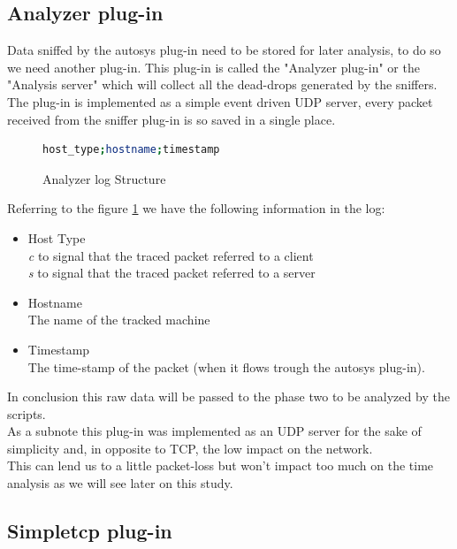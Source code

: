 \subsection{Analyzer plug-in}
Data sniffed by the autosys plug-in need to be stored for later analysis, 
to do so we need another plug-in.
This plug-in is called the "Analyzer plug-in" or the "Analysis server"
which will collect all the dead-drops generated by the sniffers.
The plug-in is implemented as a simple event driven UDP server, every
packet received from the sniffer plug-in is so saved in a single place.
\begin{figure}[H]
\begin{lstlisting}[language=bash,frame=single]
host_type;hostname;timestamp
\end{lstlisting}
\caption{Analyzer log Structure}
\label{fig:analyzer_pack_struct}
\end{figure}
Referring to the figure \ref{fig:analyzer_pack_struct} we have the following
information in the log:
\begin{itemize}
\item Host Type \hfill \\
\emph{c} to signal that the traced packet referred to a client\\
\emph{s} to signal that the traced packet referred to a server
\item Hostname \hfill \\
The name of the tracked machine
\item Timestamp \hfill \\
The time-stamp of the packet (when it flows trough the autosys plug-in).
\end{itemize}

In conclusion this raw data will be passed to the phase two to be analyzed by the scripts.\\

As a subnote this plug-in was implemented as an UDP server for the sake of
simplicity and, in opposite to TCP, the low impact on the network.\\
This can lend us to a little packet-loss but won't impact too much on the time analysis
as we will see later on this study.

\subsection{Simpletcp plug-in}
